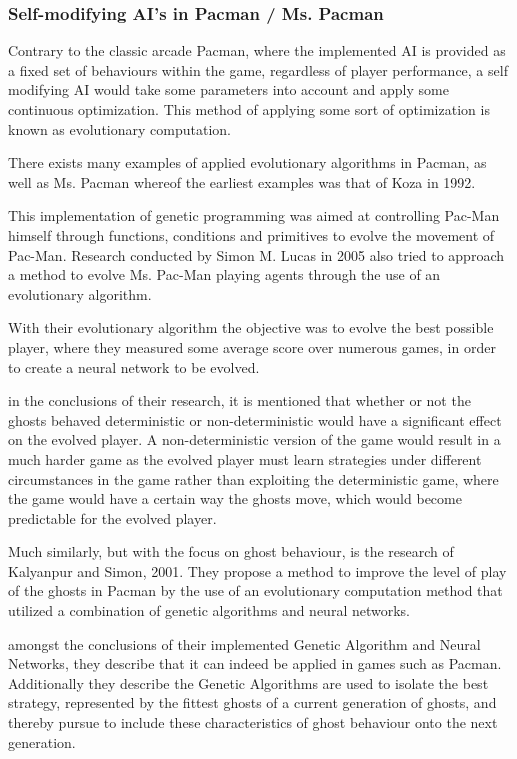 \subsubsection{Self-modifying AI's in Pacman / Ms. Pacman}

Contrary to the classic arcade Pacman, where the implemented AI is provided as a fixed set of behaviours within the game, regardless of player performance, a self modifying AI would take some parameters into account and apply some continuous optimization. This method of applying some sort of optimization is known as evolutionary computation.


There exists many examples of applied evolutionary algorithms in Pacman, as well as Ms. Pacman whereof the earliest examples was that of Koza in 1992.\cite{Koza1992}

This implementation of genetic programming was aimed at controlling Pac-Man himself through functions, conditions and primitives to evolve the movement of Pac-Man. \cite[pp. 2]{Lucas2005}
Research conducted by Simon M. Lucas in 2005 also tried to approach a method to evolve Ms. Pac-Man playing agents through the use of an evolutionary algorithm. \cite{Lucas2005}

With their evolutionary algorithm the objective was to evolve the best possible player, where they measured some average score over numerous games, in order to create a neural network to be evolved. \cite[pp. 8]{Lucas2005}

in the conclusions of their research, it is mentioned that whether or not the ghosts behaved deterministic or non-deterministic would have a significant effect on the evolved player. A non-deterministic version of the game would result in a much harder game  as the evolved player must learn strategies under different circumstances in the game rather than exploiting the deterministic game, where the game would have a certain way the ghosts move, which would become predictable for the evolved player.\cite[pp. 8]{Lucas2005}

Much similarly, but with the focus on ghost behaviour, is the research of Kalyanpur and Simon, 2001. They propose a method to improve the level of play of the ghosts in Pacman by the use of an evolutionary computation method that utilized a combination of genetic algorithms and neural networks. \cite{Kalyanpur2001}

amongst the conclusions of their implemented Genetic Algorithm and Neural Networks, they describe that it can indeed be applied in games such as Pacman. Additionally they describe the Genetic Algorithms are used to isolate the best strategy, represented by the fittest ghosts of a current generation of ghosts, and thereby pursue to include these characteristics of ghost behaviour onto the next generation. \cite[pp. 8]{Kalyanpur2001}

